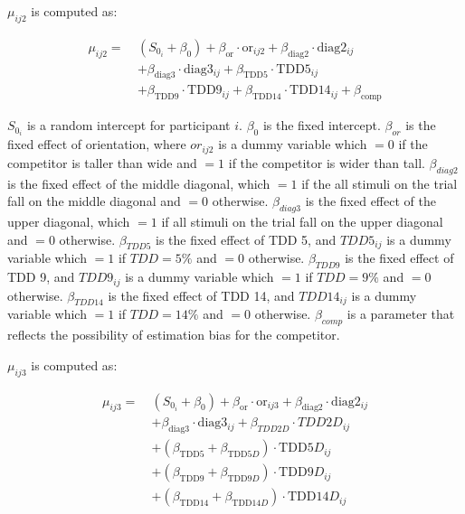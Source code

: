 $\mu_{ij2}$ is computed as:

\begin{equation}
    \begin{aligned}
    \mu_{ij2} =\ & (S_{0_i} + \beta_{0}) 
    + \beta_{\mathrm{or}} \cdot \mathrm{or}_{ij2} 
    + \beta_{\mathrm{diag}2} \cdot \mathrm{diag}2_{ij} \\
    & + \beta_{\mathrm{diag}3} \cdot \mathrm{diag}3_{ij} 
    + \beta_{\mathrm{TDD}5} \cdot \mathrm{TDD}5_{ij} \\
    & + \beta_{\mathrm{TDD}9} \cdot \mathrm{TDD}9_{ij} 
    + \beta_{\mathrm{TDD}14} \cdot \mathrm{TDD}14_{ij} 
    + \beta_{\mathrm{comp}}
    \end{aligned}
    \label{circle_mu_eqn2}
\end{equation}


$S_{0_i}$ is a random intercept for participant $i$. $\beta_{0}$ is the fixed intercept. $\beta_{or}$ is the fixed effect of orientation, where $or_{ij2}$ is a dummy variable which $=0$ if the competitor is taller than wide and $=1$ if the competitor is wider than tall. $\beta_{diag2}$ is the fixed effect of the middle diagonal, which $=1$ if the all stimuli on the trial fall on the middle diagonal and $=0$ otherwise. $\beta_{diag3}$ is the fixed effect of the upper diagonal, which $=1$ if all stimuli on the trial fall on the upper diagonal and $=0$ otherwise. $\beta_{TDD5}$ is the fixed effect of TDD 5, and $TDD5_{ij}$ is a dummy variable which $=1$ if $TDD=5\%$ and $=0$ otherwise. $\beta_{TDD9}$ is the fixed effect of TDD 9, and $TDD9_{ij}$ is a dummy variable which $=1$ if $TDD=9\%$ and $=0$ otherwise. $\beta_{TDD14}$ is the fixed effect of TDD 14, and $TDD14_{ij}$ is a dummy variable which $=1$ if $TDD=14\%$ and $=0$ otherwise. $\beta_{comp}$ is a parameter that reflects the possibility of estimation bias for the competitor.

$\mu_{ij3}$ is computed as:

\begin{equation}
    \begin{aligned}
    \mu_{ij3} =\ & (S_{0_i} + \beta_{0}) 
    + \beta_{\mathrm{or}} \cdot \mathrm{or}_{ij3} 
    + \beta_{\mathrm{diag}2} \cdot \mathrm{diag}2_{ij} \\
    & + \beta_{\mathrm{diag}3} \cdot \mathrm{diag}3_{ij} 
    + \beta_{TDD2D} \cdot TDD2D_{ij} \\
    & + (\beta_{\mathrm{TDD}5} + \beta_{\mathrm{TDD}5D}) \cdot \mathrm{TDD}5D_{ij} \\
    & + (\beta_{\mathrm{TDD}9} + \beta_{\mathrm{TDD}9D}) \cdot \mathrm{TDD}9D_{ij} \\
    & + (\beta_{\mathrm{TDD}14} + \beta_{\mathrm{TDD}14D}) \cdot \mathrm{TDD}14D_{ij}
    \end{aligned}
    \label{circle_mu_eqn3}
\end{equation}


